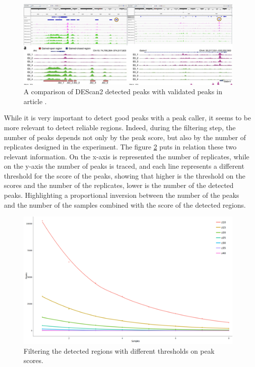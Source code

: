 \begin{figure}[H]
\includegraphics[width=\textwidth,height=\textheight,keepaspectratio]{img/descan2/peaks.png}
\caption[DEScan2 peaks detection]{A comparison of DEScan2 detected peaks with validated peaks in article \cite{Su2017}.}
\label{fig:peaksdescan}
\centering
\end{figure}

While it is very important to detect good peaks with a peak caller, it seems to be more relevant to detect reliable regions. Indeed, during the filtering step, the number of peaks depends not only by the peak score, but also by the number of replicates designed in the experiment.
The figure \ref{fig:filteringdescan} puts in relation these two relevant information. 
On the x-axis is represented the number of replicates, while on the y-axis the number of peaks is traced, and each line represents a different threshold for the score of the peaks, showing that higher is the threshold on the scores and the number of the replicates, lower is the number of the detected peaks.
Highlighting a proportional inversion between the number of the peaks and the number of the samples combined with the score of the detected regions.


\begin{figure}[H]
\includegraphics[width=\textwidth, height=\textheight, keepaspectratio]{img/descan2/filtering.png}
\caption[DEScan2 filtering step]{Filtering the detected regions with different thresholds on peak scores.}
\label{fig:filteringdescan}
\centering
\end{figure}


